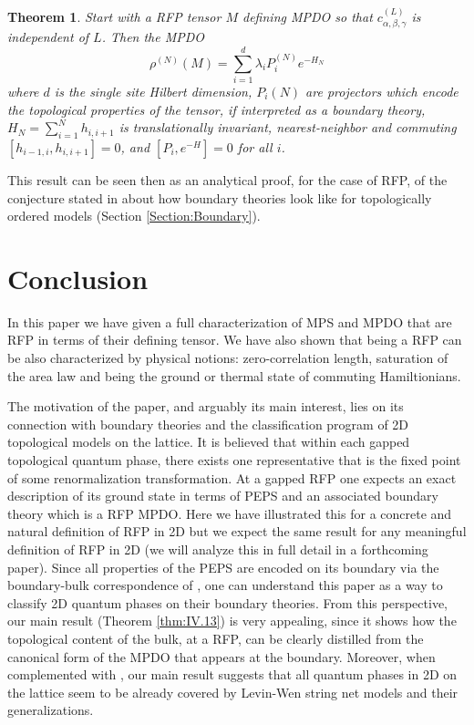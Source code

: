 \documentclass{elsarticle}
\newtheorem{thm}{Theorem}[section]
\begin{document}
\begin{thm}
Start with a  RFP tensor $M$  defining  MPDO so that $c_{\alpha,\beta,\gamma}^{(L)}$  is independent of $L$. Then the MPDO
$$\rho^{(N)}(M)=\sum_{i=1}^d \lambda_i P^{(N)}_i e^{-H_N}$$ where $d$ is the single site Hilbert dimension, $P_i{(N)}$ are projectors which encode the {\em topological properties of the tensor, if interpreted as a boundary theory}, $H_N=\sum_{i=1}^Nh_{i,i+1}$ is translationally invariant, nearest-neighbor and commuting $[h_{i-1,i},h_{i,i+1}]=0$, and $[P_i,e^{-H}]=0$ for all $i$.
\end{thm}


This result can be seen then as an analytical proof, for the case of RFP, of the conjecture stated in \cite{bulkboundconj} about how boundary theories look like for topologically ordered models (Section \ref{Section:Boundary}).

\section{Conclusion}

In this paper we have given a full characterization of MPS and MPDO that are RFP in terms of their defining tensor. We have also shown that being a RFP can be also characterized by physical notions: zero-correlation length, saturation of the area law and being the ground or thermal state of commuting Hamiltionians.

The motivation of the paper, and arguably its main interest, lies on its connection with boundary theories and the classification program of 2D topological models on the lattice. It is believed that within each gapped topological quantum phase, there exists one representative that is the fixed point of some renormalization transformation. At a gapped RFP one expects an exact description of its ground state in terms of PEPS and an associated boundary theory which is a RFP MPDO. Here we have illustrated this for a concrete and natural definition of RFP in 2D but we expect the same result for any meaningful definition of RFP in 2D (we will analyze this in full detail in a forthcoming paper).  Since all properties of the PEPS are encoded on its boundary via the boundary-bulk correspondence of \cite{bulkboundary}, one can understand this paper as a way to classify 2D quantum phases on their boundary theories. From this perspective, our main result (Theorem \ref{thm:IV.13}) is very appealing, since it shows how the topological content of the bulk, at a RFP, can be clearly distilled from the canonical form of the MPDO that appears at the boundary.  Moreover, when complemented with \cite{FrankStrings}, our main result suggests that all quantum phases in 2D on the lattice seem to be already covered by Levin-Wen string net models and their generalizations.
\end{document}
